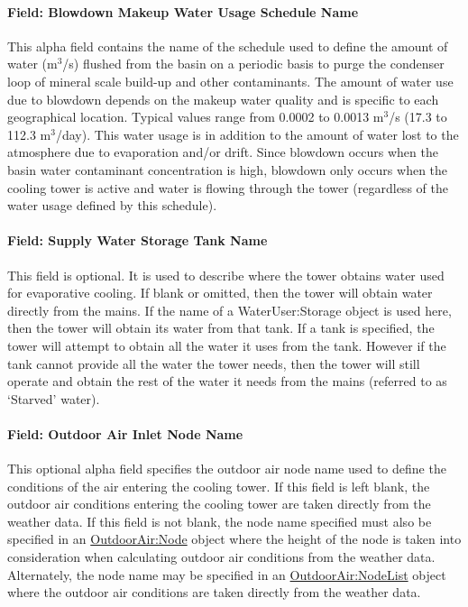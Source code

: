 \paragraph{Field: Blowdown Makeup Water Usage Schedule Name}\label{field-blowdown-makeup-water-usage-schedule-name-3}

This alpha field contains the name of the schedule used to define the amount of water (m\(^{3}\)/s) flushed from the basin on a periodic basis to purge the condenser loop of mineral scale build-up and other contaminants. The amount of water use due to blowdown depends on the makeup water quality and is specific to each geographical location. Typical values range from 0.0002 to 0.0013 m\(^{3}\)/s (17.3 to 112.3 m\(^{3}\)/day). This water usage is in addition to the amount of water lost to the atmosphere due to evaporation and/or drift. Since blowdown occurs when the basin water contaminant concentration is high, blowdown only occurs when the cooling tower is active and water is flowing through the tower (regardless of the water usage defined by this schedule).

\paragraph{Field: Supply Water Storage Tank Name}\label{field-supply-water-storage-tank-name-3}

This field is optional. It is used to describe where the tower obtains water used for evaporative cooling. If blank or omitted, then the tower will obtain water directly from the mains. If the name of a WaterUser:Storage object is used here, then the tower will obtain its water from that tank. If a tank is specified, the tower will attempt to obtain all the water it uses from the tank. However if the tank cannot provide all the water the tower needs, then the tower will still operate and obtain the rest of the water it needs from the mains (referred to as `Starved' water).

\paragraph{Field: Outdoor Air Inlet Node Name}\label{field-outdoor-air-inlet-node-name-3}

This optional alpha field specifies the outdoor air node name used to define the conditions of the air entering the cooling tower. If this field is left blank, the outdoor air conditions entering the cooling tower are taken directly from the weather data. If this field is not blank, the node name specified must also be specified in an \hyperref[outdoorairnode]{OutdoorAir:Node} object where the height of the node is taken into consideration when calculating outdoor air conditions from the weather data. Alternately, the node name may be specified in an \hyperref[outdoorairnodelist]{\hyperref[outdoorairnode]{OutdoorAir:Node}List} object where the outdoor air conditions are taken directly from the weather data.

